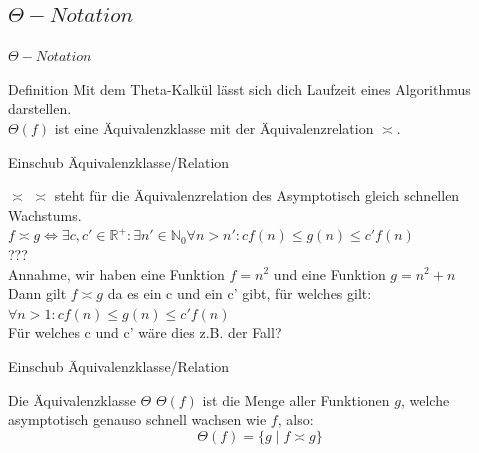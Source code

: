 	
	\subsection{$\Theta - Notation$}
	\begin{frame}{$\Theta - Notation$}
		\begin{block}{Definition}
			Mit dem Theta-Kalkül lässt sich dich Laufzeit eines Algorithmus darstellen.\\
			\vspace{10pt}
			$\Theta(f)$ ist eine Äquivalenzklasse mit der Äquivalenzrelation $\asymp$.
			
			
		\end{block}
	\end{frame}
	
	
	\begin{frame} {Einschub Äquivalenzklasse/Relation}
	
		\begin{block}{$\asymp$}
			$\asymp$ steht für die Äquivalenzrelation des Asymptotisch gleich schnellen Wachstums.\\
			$f \asymp g \Leftrightarrow \exists c,c' \in \mathbb{R}^+: \exists n'\in \mathbb{N}_0 \forall n > n': cf(n) \leq g(n) \leq c'f(n)$\\
			\vspace{10pt}
			\pause
			???\\
			\pause
			Annahme, wir haben eine Funktion $f = n^2$ und eine Funktion $g = n^2 + n$\\
			Dann gilt $f \asymp g$ da es ein c und ein c' gibt, für welches gilt:\\
			$\forall n > 1: cf(n) \leq g(n) \leq c'f(n)$ \\
			\vspace{10pt}
			\visible<4-> Für welches c und c' wäre dies z.B. der Fall?
			
		\end{block}
	
	\end{frame}
	
	
	\begin{frame} {Einschub Äquivalenzklasse/Relation}
	
		\begin{block}{Die Äquivalenzklasse $\Theta$}
			$\Theta(f)$ ist die Menge aller Funktionen $g$, welche asymptotisch genauso schnell wachsen wie $f$, also:\\
			\[\Theta(f) = \{g\;|\;f \asymp g\}\]
		\end{block}
	
	\end{frame}
	

